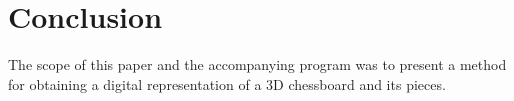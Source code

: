 \documentclass[conference]{IEEEtran}
\begin{document}
%






\section{Conclusion}

The scope of this paper and the accompanying program was to present a method for obtaining a digital representation of a 3D chessboard and its pieces.
\end{document}
